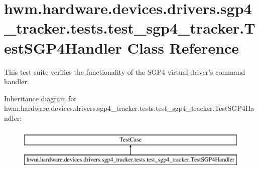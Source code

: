 \hypertarget{classhwm_1_1hardware_1_1devices_1_1drivers_1_1sgp4__tracker_1_1tests_1_1test__sgp4__tracker_1_1_test_s_g_p4_handler}{\section{hwm.\-hardware.\-devices.\-drivers.\-sgp4\-\_\-tracker.\-tests.\-test\-\_\-sgp4\-\_\-tracker.\-Test\-S\-G\-P4\-Handler Class Reference}
\label{classhwm_1_1hardware_1_1devices_1_1drivers_1_1sgp4__tracker_1_1tests_1_1test__sgp4__tracker_1_1_test_s_g_p4_handler}
}


This test suite verifies the functionality of the S\-G\-P4 virtual driver's command handler.  


Inheritance diagram for hwm.\-hardware.\-devices.\-drivers.\-sgp4\-\_\-tracker.\-tests.\-test\-\_\-sgp4\-\_\-tracker.\-Test\-S\-G\-P4\-Handler\-:\begin{figure}[H]
\begin{center}
\leavevmode
\includegraphics[height=2.000000cm]{classhwm_1_1hardware_1_1devices_1_1drivers_1_1sgp4__tracker_1_1tests_1_1test__sgp4__tracker_1_1_test_s_g_p4_handler}
\end{center}
\end{figure}
